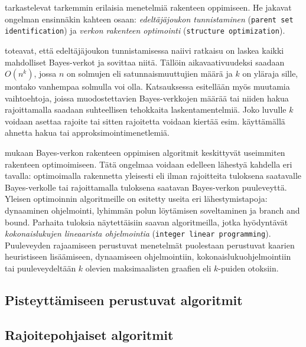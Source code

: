 \citet{scanagatta_survey_2019} tarkastelevat tarkemmin erilaisia menetelmiä rakenteen oppimiseen. He jakavat ongelman ensinnäkin kahteen osaan: \emph{edeltäjäjoukon tunnistaminen} (\texttt{parent set identification}) ja \emph{verkon rakenteen optimointi} (\texttt{structure optimization}). 

\citet{scanagatta_survey_2019} toteavat, että edeltäjäjoukon tunnistamisessa naiivi ratkaisu on laskea kaikki mahdolliset Bayes-verkot ja sovittaa niitä. Tällöin aikavaativuudeksi saadaan $O(n^k)$, jossa $n$ on solmujen eli satunnaismuuttujien määrä ja $k$ on yläraja sille, montako vanhempaa solmulla voi olla. Katsauksessa esitellään myös muutamia vaihtoehtoja, joissa muodostettavien Bayes-verkkojen määrää tai niiden hakua rajoittamalla saadaan suhteellisen tehokkaita laskentamentelmiä. Joko luvulle $k$ voidaan asettaa rajoite tai sitten rajoitetta voidaan kiertää esim. käyttämällä ahnetta hakua tai approksimointimenetlemiä.

\citet{scanagatta_survey_2019} mukaan Bayes-verkon rakenteen oppimisen algoritmit keskittyvät useimmiten rakenteen optimoimiseen. Tätä ongelmaa voidaan edelleen lähestyä kahdella eri tavalla: optimoimalla rakennetta yleisesti eli ilman rajoitteita tuloksena saatavalle Bayes-verkolle tai rajoittamalla tuloksena saatavan Bayes-verkon puuleveyttä. Yleisen optimoinnin algoritmeille on esitetty useita eri lähestymistapoja: dynaaminen ohjelmointi, lyhimmän polun löytämisen soveltaminen ja branch and bound. Parhaita tuloksia näytettäisiin saavan algoritmeilla, jotka hyödyntävät \emph{kokonaislukujen lineaarista ohjelmointia} (\texttt{integer linear programming}). Puuleveyden rajaamiseen perustuvat menetelmät puolestaan perustuvat kaarien heuristiseen lisäämiseen, dynaamiseen ohjelmointiin, kokonaislukuohjelmointiin tai puuleveydeltään $k$ olevien maksimaalisten graafien eli $k$-puiden otoksiin.

\subsection{Pisteyttämiseen perustuvat algoritmit}
\subsection{Rajoitepohjaiset algoritmit}